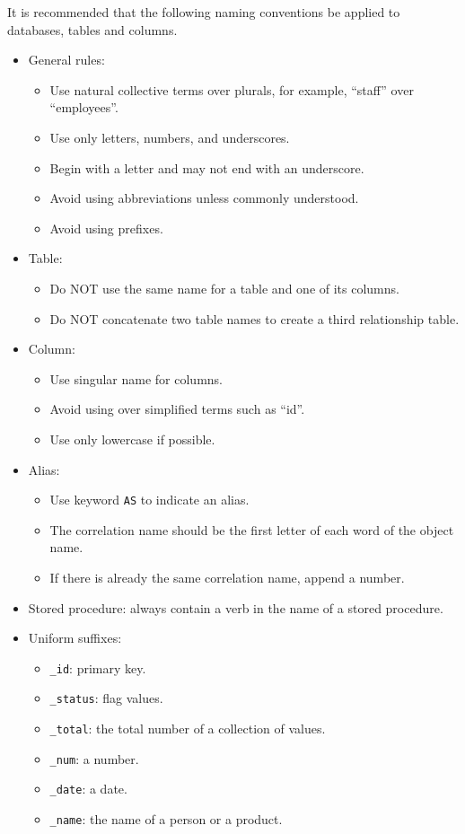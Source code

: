 It is recommended that the following naming conventions be applied to databases, tables and columns.
\begin{itemize}
\item General rules:
\begin{itemize}
\item Use natural collective terms over plurals, for example, ``staff'' over ``employees''.
\item Use only letters, numbers, and underscores.
\item Begin with a letter and may not end with an underscore.
\item Avoid using abbreviations unless commonly understood.
\item Avoid using prefixes.
\end{itemize}
\item Table:
\begin{itemize}
	\item Do NOT use the same name for a table and one of its columns.
	\item Do NOT concatenate two table names to create a third relationship table.
\end{itemize}
\item Column:
\begin{itemize}
	\item Use singular name for columns.
	\item Avoid using over simplified terms such as ``id''.
	\item Use only lowercase if possible.
\end{itemize}
\item Alias:
\begin{itemize}
	\item Use keyword \verb|AS| to indicate an alias.
	\item The correlation name should be the first letter of each word of the object name.
	\item If there is already the same correlation name, append a number.
\end{itemize}
\item Stored procedure: always contain a verb in the name of a stored procedure.
\item Uniform suffixes:
\begin{itemize}
	\item \verb|_id|: primary key.
	\item \verb|_status|: flag values.
	\item \verb|_total|: the total number of a collection of values.
	\item \verb|_num|: a number.
	\item \verb|_date|: a date.
	\item \verb|_name|: the name of a person or a product.
\end{itemize}
\end{itemize}

